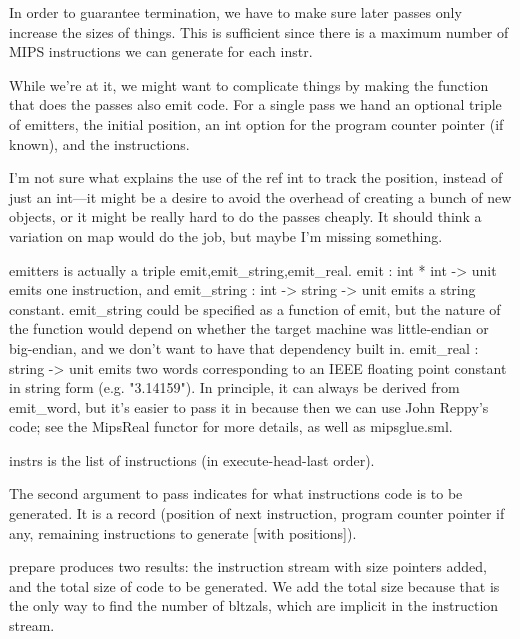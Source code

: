 In order to guarantee termination, we have to make sure later passes only 
increase the sizes of things.
This is sufficient since there is a maximum number of MIPS instructions
we can generate for each \code{}instr\edoc{}.


While we're at it, we might want to complicate things by making the function
that does the passes also emit code.
For a single pass we hand an optional triple of emitters, the initial position,
an \code{}int option\edoc{} for the program counter pointer (if known), and the
instructions.



I'm not sure what explains the use of the \code{}ref int\edoc{} to track the position,
instead of just an \code{}int\edoc{}---it might be a desire to avoid the
overhead of creating a bunch of new objects, or it might be really hard
to do the passes cheaply.
It should think a variation on \code{}map\edoc{} would do the job, but maybe I'm
missing something.

\enddocs
{}
\code{}emitters\edoc{} is actually a triple \code{}emit,emit_string,emit_real\edoc{}.
\code{}emit : int * int -> unit\edoc{} emits one instruction, 
and \code{}emit_string : int -> string -> unit\edoc{} emits a string constant.
\code{}emit_string\edoc{} could be specified as a function of \code{}emit\edoc{},
but the nature of the function would depend on whether the target
machine was little-endian or big-endian, and we don't want to have
that dependency built in.
\code{}emit_real : string -> unit\edoc{} emits two words corresponding to an IEEE
floating point constant in string form (e.g. \code{}"3.14159"\edoc{}).
In principle, it can always be derived from \code{}emit_word\edoc{}, but it's
easier to pass it in because then we can use John Reppy's code;
see the \code{}MipsReal\edoc{} functor for more details, as well as
\code{}mipsglue.sml\edoc{}.


 \code{}instrs\edoc{} is the
list of instructions (in execute-head-last order).

The second argument to \code{}pass\edoc{} indicates for what instructions code
is to be generated.
It is a record (position of next instruction, program counter pointer if any,
remaining instructions to generate [with positions]).

\indent \code{}prepare\edoc{} produces two results: the instruction stream with
size pointers added, and the total size of code to be generated.
We add the total size because that is the only way to find the number
of \code{}bltzal\edoc{}s, which are implicit in the instruction stream.

